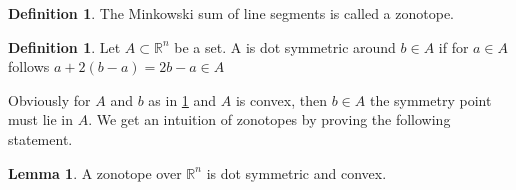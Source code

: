 \documentclass{article}
\theoremstyle{definition}
\newtheorem{lemma}[theorem]{Lemma}
\newtheorem{definition}[theorem]{Definition}
\begin{document}
\begin{definition}\cite[p.~4]{zhang2018tropical}
The Minkowski sum of line segments is called a zonotope.
\end{definition}

\begin{definition}
\label{def:dot_sym}
Let $A \subset \mathbb{R}^{n}$ be a set. A is dot symmetric around $b \in A$ if for $a \in A$ follows $a + 2(b-a)=2b-a \in A$
\end{definition}

Obviously for $A$ and $b$ as in \ref{def:dot_sym} and $A$ is convex, then $b \in A$ the symmetry point must lie in $A$. We get an intuition of zonotopes by proving the following statement.

\begin{lemma}
\label{lem:zon_sym_conv}
A zonotope over $\mathbb{R}^{n}$ is dot symmetric and convex.
\end{lemma}
\end{document}
